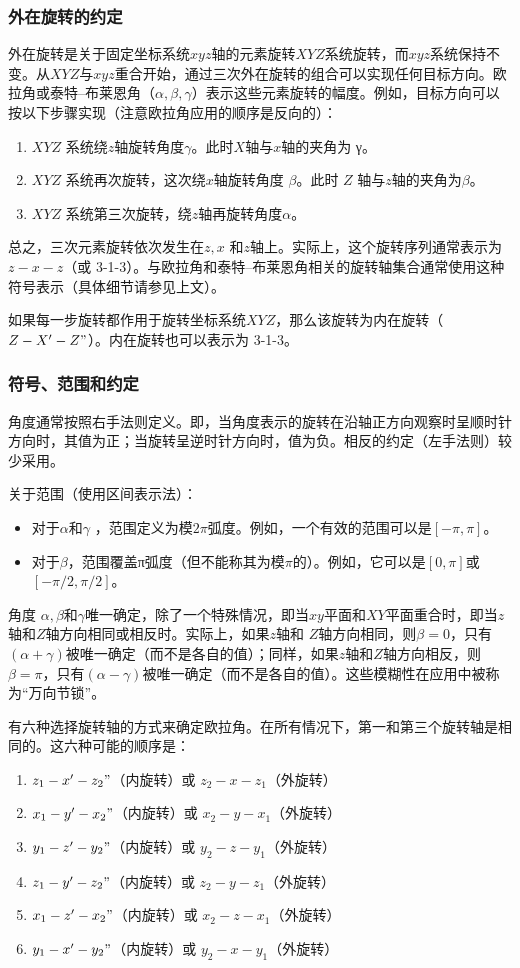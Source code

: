 \subsubsection{外在旋转的约定}

外在旋转是关于固定坐标系统$xyz$轴的元素旋转$XYZ$系统旋转，而$xyz$系统保持不变。从$XYZ$与$xyz$重合开始，通过三次外在旋转的组合可以实现任何目标方向。欧拉角或泰特–布莱恩角（$\alpha,\beta,\gamma$）表示这些元素旋转的幅度。例如，目标方向可以按以下步骤实现（注意欧拉角应用的顺序是反向的）：
\begin{enumerate}
\item $XYZ$ 系统绕$z$轴旋转角度$\gamma$。此时$X$轴与$x$轴的夹角为 γ。
\item $XYZ$ 系统再次旋转，这次绕$x$轴旋转角度 $\beta$。此时 $Z$ 轴与$z$轴的夹角为$\beta$。
\item $XYZ$ 系统第三次旋转，绕$z$轴再旋转角度$\alpha$。
\end{enumerate}
总之，三次元素旋转依次发生在$z,x$ 和$z$轴上。实际上，这个旋转序列通常表示为$z-x-z$（或 3-1-3）。与欧拉角和泰特–布莱恩角相关的旋转轴集合通常使用这种符号表示（具体细节请参见上文）。

如果每一步旋转都作用于旋转坐标系统$XYZ$，那么该旋转为内在旋转（$Z-X^\prime-Z"$）。内在旋转也可以表示为 3-1-3。
\subsubsection{符号、范围和约定}
角度通常按照右手法则定义。即，当角度表示的旋转在沿轴正方向观察时呈顺时针方向时，其值为正；当旋转呈逆时针方向时，值为负。相反的约定（左手法则）较少采用。

关于范围（使用区间表示法）：
\begin{itemize}
\item 对于$\alpha$和$\gamma$ ，范围定义为模$2\pi$弧度。例如，一个有效的范围可以是$[ -\pi,\pi]$。
\item 对于$\beta$，范围覆盖π弧度（但不能称其为模$\pi$的）。例如，它可以是$[0,\pi]$或$[-\pi/2,\pi/2]$。
\end{itemize}
角度 $\alpha,\beta$和$\gamma$唯一确定，除了一个特殊情况，即当$xy$平面和$XY$平面重合时，即当$z$轴和$Z$轴方向相同或相反时。实际上，如果$z$轴和 $Z$轴方向相同，则$\beta =0$，只有$(\alpha+\gamma)$被唯一确定（而不是各自的值）；同样，如果$z$轴和$Z$轴方向相反，则 $\beta=\pi$，只有$(\alpha-\gamma)$被唯一确定（而不是各自的值）。这些模糊性在应用中被称为“万向节锁”。

有六种选择旋转轴的方式来确定欧拉角。在所有情况下，第一和第三个旋转轴是相同的。这六种可能的顺序是：
\begin{enumerate}
\item $z_1-x'-z_2"$（内旋转）或 $z_2-x-z_1$（外旋转）  
\item $x_1-y'-x_2"$（内旋转）或 $x_2-y-x_1$（外旋转）  
\item $y_1-z'-y_2"$（内旋转）或 $y_2-z-y_1$（外旋转）  
\item $z_1-y'-z_2"$（内旋转）或 $z_2-y-z_1$（外旋转）  
\item $x_1-z'-x_2"$（内旋转）或 $x_2-z-x_1$（外旋转）  
\item $y_1-x'-y_2"$（内旋转）或 $y_2-x-y_1$（外旋转）
\end{enumerate}
